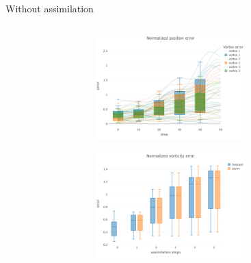 \documentclass[aspectratio=169]{beamer} %
\begin{document}
\begin{frame}{Without assimilation}
    \begin{columns}
        \begin{column}{0.5\textwidth}
            \begin{figure}[t]
                \centering
            \end{figure}
        \end{column}
        \begin{column}{0.5\textwidth}
            \begin{figure}
                \centering
                \begin{subfigure}{\textwidth}
                    \centering
                    \includegraphics[width=0.75\textwidth]{images/error_position_wo_assim.pdf}
                \end{subfigure}
                \begin{subfigure}{\textwidth}
                    \centering
                    \includegraphics[width=0.75\textwidth]{images/error_vorticity_wo_assim.pdf}
                \end{subfigure}
            \end{figure}
        \end{column}
    \end{columns}
\end{frame}
\end{document}
